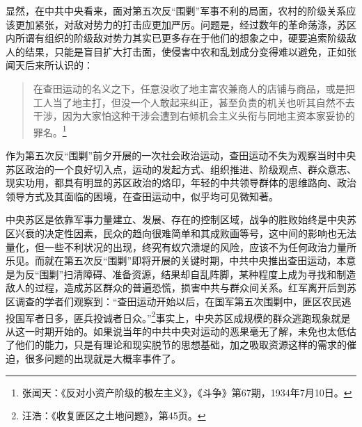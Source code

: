 显然，在中共中央看来，面对第五次反“围剿”军事不利的局面，农村的阶级关系应该更加紧张，对敌对势力的打击应更加严厉。问题是，经过数年的革命荡涤，苏区内所谓有组织的阶级敌对势力其实已更多存在于他们的想象之中，硬要追索阶级敌人的结果，只能是盲目扩大打击面，使侵害中农和乱划成分变得难以避免，正如张闻天后来所认识的：

\begin{quote}

在查田运动的名义之下，任意没收了地主富农兼商人的店铺与商品，或是把工人当了地主打，但没一个人敢起来纠正，甚至负责的机关也听其自然不去干涉，因为大家怕这种干涉会遭到右倾机会主义头衔与同地主资本家妥协的罪名。\footnote{张闻天：《反对小资产阶级的极左主义》，《斗争》第67期，1934年7月10日。}
\end{quote}


作为第五次反“围剿”前夕开展的一次社会政治运动，查田运动不失为观察当时中央苏区政治的一个良好切入点，运动的发起方式、组织推进、阶级观点、群众意志、现实功用，都具有明显的苏区政治的烙印，年轻的中共领导群体的思维路向、政治领导方式及其面临的困境，在查田运动中，似乎均可见微知著。


中央苏区是依靠军事力量建立、发展、存在的控制区域，战争的胜败始终是中央苏区兴衰的决定性因素，民众的趋向很难简单和其成败画等号，这中间的影响也无法量化，但一些不利状况的出现，终究有蚁穴溃堤的风险，应该不为任何政治力量所乐见。而就在第五次反“围剿”即将开展的关键时期，中共中央推出查田运动，本意是为反“围剿”扫清障碍、准备资源，结果却自乱阵脚，某种程度上成为寻找和制造敌人的过程，造成苏区群众的普遍恐慌，损害中共与群众间关系。红军离开后到苏区调查的学者们观察到：“查田运动开始以后，在国军第五次围剿中，匪区农民逃投国军者日多，匪兵投诚者日众。”\footnote{汪浩：《收复匪区之土地问题》，第45页。}事实上，中央苏区成规模的群众逃跑现象就是从这一时期开始的。如果说当年的中共中央对运动的恶果毫无了解，未免也太低估了他们的能力，只是有理论和现实脱节的思想基础，加之吸取资源这样的需求的催迫，很多问题的出现就是大概率事件了。


